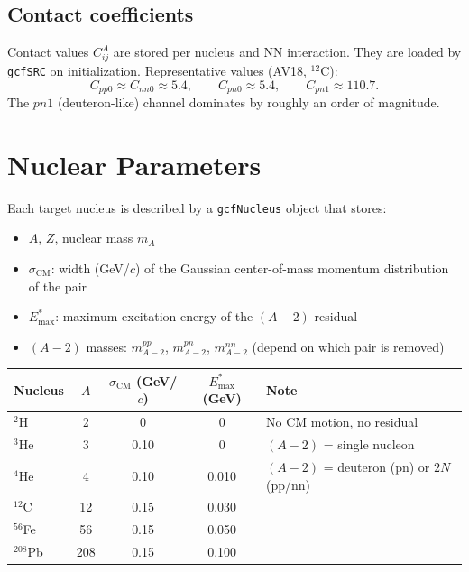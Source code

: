 \documentclass[11pt,a4paper]{article}
\begin{document}
\subsection{Contact coefficients}

Contact values $C_{ij}^{A}$ are stored per nucleus and NN interaction.
They are loaded by \texttt{gcfSRC} on initialization.  Representative
values (AV18, $^{12}$C):
\begin{equation}
  C_{pp0} \approx C_{nn0} \approx 5.4,
  \qquad
  C_{pn0} \approx 5.4,
  \qquad
  C_{pn1} \approx 110.7.
\end{equation}
The $pn1$ (deuteron-like) channel dominates by roughly an order of magnitude.

\section{Nuclear Parameters}

Each target nucleus is described by a \texttt{gcfNucleus} object that stores:
\begin{itemize}[nosep]
  \item $A$, $Z$, nuclear mass $m_{A}$
  \item $\sigma_{\text{CM}}$: width (GeV/$c$) of the Gaussian center-of-mass
        momentum distribution of the pair
  \item $E^{*}_{\max}$: maximum excitation energy of the $(A{-}2)$ residual
  \item $(A{-}2)$ masses: $m_{A{-}2}^{pp}$, $m_{A{-}2}^{pn}$, $m_{A{-}2}^{nn}$
        (depend on which pair is removed)
\end{itemize}

\begin{center}
\begin{tabular}{lcccl}
\toprule
Nucleus & $A$ & $\sigma_{\text{CM}}$ (GeV/$c$) & $E^{*}_{\max}$ (GeV) & Note \\
\midrule
$^{2}$H  &  2  & 0       & 0     & No CM motion, no residual \\
$^{3}$He &  3  & 0.10    & 0     & $(A{-}2)$ = single nucleon \\
$^{4}$He &  4  & 0.10    & 0.010 & $(A{-}2)$ = deuteron (pn) or $2N$ (pp/nn) \\
$^{12}$C & 12  & 0.15    & 0.030 & \\
$^{56}$Fe& 56  & 0.15    & 0.050 & \\
$^{208}$Pb&208 & 0.15    & 0.100 & \\
\bottomrule
\end{tabular}
\end{center}
\end{document}
